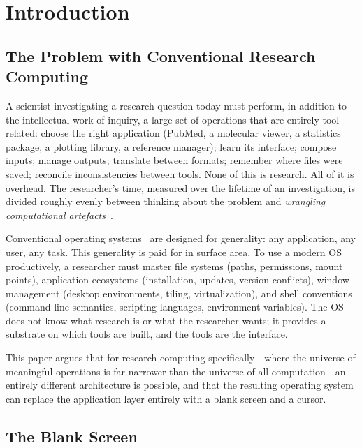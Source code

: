 \documentclass[11pt,twocolumn,a4paper]{article}
\begin{document}
\section{Introduction}
\label{sec:introduction}

\subsection{The Problem with Conventional Research Computing}

A scientist investigating a research question today must perform, in addition to the intellectual work of inquiry, a large set of operations that are entirely tool-related: choose the right application (PubMed, a molecular viewer, a statistics package, a plotting library, a reference manager); learn its interface; compose inputs; manage outputs; translate between formats; remember where files were saved; reconcile inconsistencies between tools. None of this is research. All of it is overhead. The researcher's time, measured over the lifetime of an investigation, is divided roughly evenly between thinking about the problem and \emph{wrangling computational artefacts}~\cite{wilson2014best,kanza2017electronic}.

Conventional operating systems~\cite{tanenbaum2015modern,silberschatz2018operating,ritchie1974unix} are designed for generality: any application, any user, any task. This generality is paid for in surface area. To use a modern OS productively, a researcher must master file systems (paths, permissions, mount points), application ecosystems (installation, updates, version conflicts), window management (desktop environments, tiling, virtualization), and shell conventions (command-line semantics, scripting languages, environment variables). The OS does not know what research is or what the researcher wants; it provides a substrate on which tools are built, and the tools are the interface.

This paper argues that for research computing specifically---where the universe of meaningful operations is far narrower than the universe of all computation---an entirely different architecture is possible, and that the resulting operating system can replace the application layer entirely with a blank screen and a cursor.

\subsection{The Blank Screen}
\end{document}
